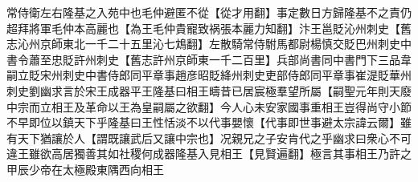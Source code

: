 常侍衛左右隆基之入苑中也毛仲避匿不從【從才用翻】事定數日方歸隆基不之責仍超拜將軍毛仲本高麗也【為王毛仲貴寵致祸張本麗力知翻】汴王邕貶沁州刺史【舊志沁州京師東北一千二十五里沁七鴆翻】左散騎常侍駙馬都尉楊慎交貶巴州刺史中書令蕭至忠貶許州刺史【舊志許州京師東一千二百里】兵部尚書同中書門下三品韋嗣立貶宋州刺史中書侍郎同平章事趙彦昭貶絳州刺史吏部侍郎同平章事崔湜貶華州刺史劉幽求言於宋王成器平王隆基曰相王疇昔已居宸極羣望所屬【嗣聖元年則天廢中宗而立相王及革命以王為皇嗣屬之欲翻】今人心未安家國事重相王豈得尚守小節不早即位以鎮天下乎隆基曰王性恬淡不以代事嬰懷【代事即世事避太宗諱云爾】雖有天下猶讓於人【謂既讓武后又讓中宗也】况親兄之子安肯代之乎幽求曰衆心不可違王雖欲高居獨善其如社稷何成器隆基入見相王【見賢遍翻】極言其事相王乃許之甲辰少帝在太極殿東隅西向相王